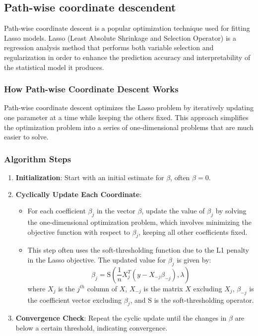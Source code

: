 \documentclass[
]{article}
\providecommand{\tightlist}{%
  \setlength{\itemsep}{0pt}\setlength{\parskip}{0pt}}
\begin{document}
\hypertarget{path-wise-coordinate-descendent}{%
\subsection{Path-wise coordinate
descendent}\label{path-wise-coordinate-descendent}}

Path-wise coordinate descent is a popular optimization technique used
for fitting Lasso models. Lasso (Least Absolute Shrinkage and Selection
Operator) is a regression analysis method that performs both variable
selection and regularization in order to enhance the prediction accuracy
and interpretability of the statistical model it produces.

\hypertarget{how-path-wise-coordinate-descent-works}{%
\subsubsection{How Path-wise Coordinate Descent
Works}\label{how-path-wise-coordinate-descent-works}}

Path-wise coordinate descent optimizes the Lasso problem by iteratively
updating one parameter at a time while keeping the others fixed. This
approach simplifies the optimization problem into a series of
one-dimensional problems that are much easier to solve.

\hypertarget{algorithm-steps-1}{%
\subsubsection{Algorithm Steps}\label{algorithm-steps-1}}

\begin{enumerate}
\def\labelenumi{\arabic{enumi}.}
\item
  \textbf{Initialization}: Start with an initial estimate for \(\beta\),
  often \(\beta = 0\).
\item
  \textbf{Cyclically Update Each Coordinate}:

  \begin{itemize}
  \tightlist
  \item
    For each coefficient \(\beta_j\) in the vector \(\beta\), update the
    value of \(\beta_j\) by solving the one-dimensional optimization
    problem, which involves minimizing the objective function with
    respect to \(\beta_j\), keeping all other coefficients fixed.
  \item
    This step often uses the soft-thresholding function due to the L1
    penalty in the Lasso objective. The updated value for \(\beta_j\) is
    given by:
    \[ \beta_j = \text{S}( \frac{1}{n} X_j^T(y - X_{-j}\beta_{-j}), \lambda ) \]
    where \(X_j\) is the \(j^{th}\) column of \(X\), \(X_{-j}\) is the
    matrix \(X\) excluding \(X_j\), \(\beta_{-j}\) is the coefficient
    vector excluding \(\beta_j\), and \(\text{S}\) is the
    soft-thresholding operator.
  \end{itemize}
\item
  \textbf{Convergence Check}: Repeat the cyclic update until the changes
  in \(\beta\) are below a certain threshold, indicating convergence.
\end{enumerate}
\end{document}
